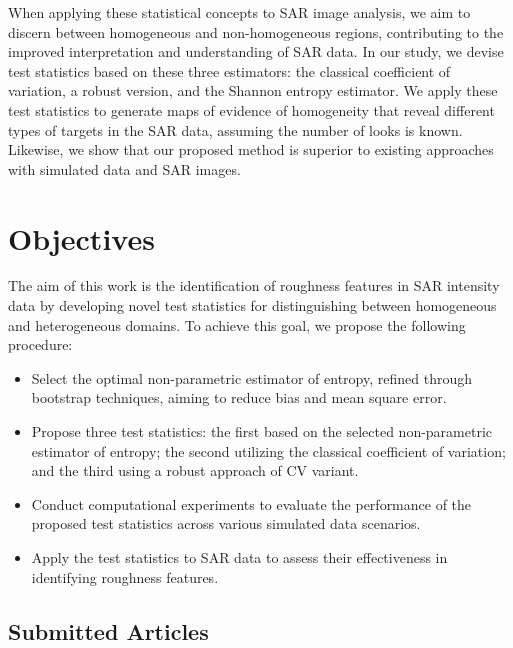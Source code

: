 When applying these statistical concepts to SAR image analysis, we aim to discern between homogeneous and non-homogeneous regions, contributing to the improved interpretation and understanding of SAR data.  In our study, we devise test statistics based on these three estimators: the classical coefficient of variation, a robust version, and the Shannon entropy estimator. We apply these test statistics to generate maps of evidence of homogeneity that reveal different types of targets in the SAR data, assuming the number of looks is known. Likewise, we show that our proposed method is superior to existing approaches with simulated data and SAR images.





\section{Objectives}

The aim of this work is the identification of roughness features in SAR intensity data by developing novel test statistics for distinguishing between homogeneous and heterogeneous domains. 
To achieve this goal, we propose the following procedure:

\begin{itemize}
    \item Select the optimal non-parametric estimator of entropy, refined through bootstrap techniques, aiming to reduce bias and mean square error.
    \item Propose three test statistics: the first based on the selected non-parametric estimator of entropy; the second utilizing the classical coefficient of variation; and the third using a robust approach of CV variant.
    \item Conduct computational experiments to evaluate the performance of the proposed test statistics across various simulated data scenarios.
    \item Apply the test statistics to SAR data to assess their effectiveness in identifying roughness features.
\end{itemize}

\subsection*{Submitted Articles}

